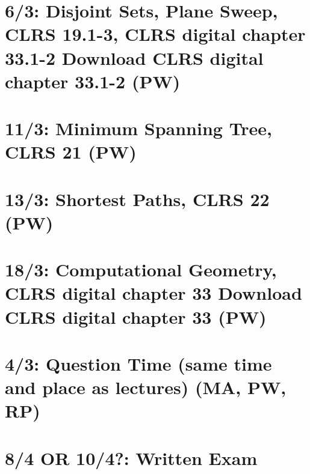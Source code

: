 \section{6/3: Disjoint Sets, Plane Sweep, CLRS 19.1-3, CLRS digital chapter 33.1-2
  Download CLRS digital chapter 33.1-2 (PW)}
\section{11/3: Minimum Spanning Tree, CLRS 21 (PW)}
\section{13/3: Shortest Paths, CLRS 22 (PW)}
\section{18/3: Computational Geometry, CLRS digital chapter 33
  Download CLRS digital chapter 33 (PW)}
\section{4/3: Question Time (same time and place as lectures) (MA, PW, RP)}
\section{8/4 OR 10/4?: Written Exam}
